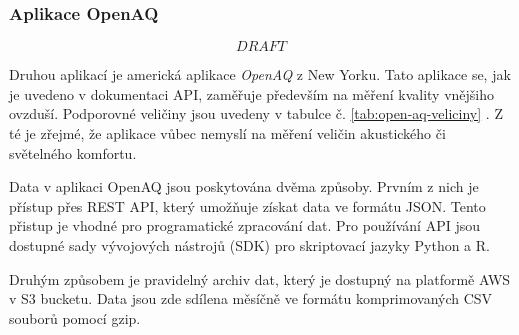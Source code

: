 \subsubsection{Aplikace OpenAQ}

\[DRAFT\]

Druhou aplikací je americká aplikace \textit{OpenAQ} z New Yorku. Tato aplikace se, jak je uvedeno v dokumentaci API, zaměřuje především na měření kvality vnějšiho ovzduší. Podporovné veličiny jsou uvedeny v tabulce č. \ref{tab:open-aq-veliciny} \parencite{API}. Z té je zřejmé, že aplikace vůbec nemyslí na měření veličin akustického či světelného komfortu. 

Data v aplikaci OpenAQ jsou poskytována dvěma způsoby. 
Prvním z nich je přístup přes REST API, který umožňuje získat data ve formátu JSON. Tento přistup je vhodné pro programatické zpracování dat. Pro používání API jsou dostupné sady vývojových nástrojů (SDK) pro skriptovací jazyky Python a R. \parencite{API}  

Druhým způsobem je pravidelný archiv dat, který je dostupný na platformě AWS v S3 bucketu. Data jsou zde sdílena měsíčně ve formátu komprimovaných CSV souborů pomocí gzip. \parencite{zotero-item-552}

